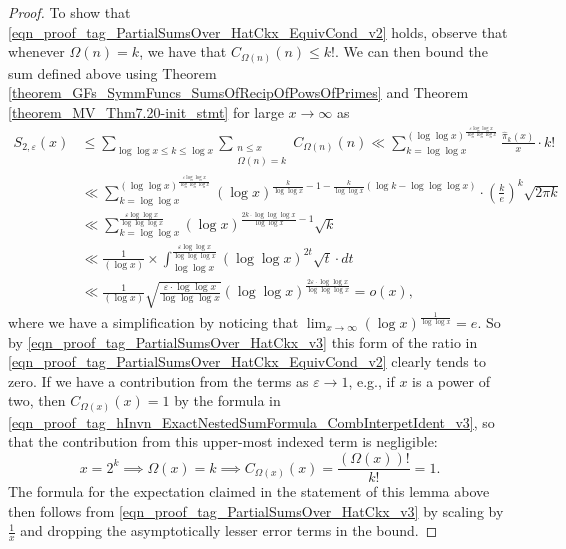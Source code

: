 \documentclass[11pt,reqno,a4letter]{article}
\numberwithin{figure}{section}
\numberwithin{table}{section}
\theoremstyle{plain}
\numberwithin{theorem}{section}
\theoremstyle{definition}
\begin{document}
\begin{proof}
To show that \eqref{eqn_proof_tag_PartialSumsOver_HatCkx_EquivCond_v2} holds, 
observe that whenever $\Omega(n) = k$, we have that $C_{\Omega(n)}(n) \leq k!$. 
We can then bound the sum defined above using 
Theorem \ref{theorem_GFs_SymmFuncs_SumsOfRecipOfPowsOfPrimes} and 
Theorem \ref{theorem_MV_Thm7.20-init_stmt} for large $x \rightarrow \infty$ as 
\begin{align*} 
S_{2,\varepsilon}(x) & \leq 
     \sum_{\log\log x \leq k \leq \log x} \sum_{\substack{n \leq x \\ \Omega(n)=k}} C_{\Omega(n)}(n) 
     \ll \sum_{k=\log\log x}^{(\log\log x)^{\frac{\varepsilon \log\log x}{\log\log\log x}}} 
      \frac{\widehat{\pi}_k(x)}{x} \cdot k! \\ 
     & \ll \sum_{k=\log\log x}^{(\log\log x)^{\frac{\varepsilon \log\log x}{\log\log\log x}}} 
     (\log x)^{\frac{k}{\log\log x} - 1 - \frac{k}{\log\log x} \left( 
     \log k - \log\log\log x\right)} \cdot \left(\frac{k}{e}\right)^{k} \sqrt{2\pi k} \\ 
     & \ll \sum_{k=\log\log x}^{\frac{\varepsilon \log\log x}{\log\log\log x}} 
     (\log x)^{\frac{2k \cdot \log\log\log x}{\log\log x} - 1} \sqrt{k} \\ 
     & \ll \frac{1}{(\log x)} \times \int_{\log\log x}^{ 
     \frac{\varepsilon \log\log x}{\log\log\log x}} (\log\log x)^{2t} \sqrt{t} \cdot dt \\ 
     & \ll \frac{1}{(\log x)} \sqrt{\frac{\varepsilon \cdot \log\log x}{\log\log\log x}} 
     (\log\log x)^{\frac{2\varepsilon \cdot \log\log x}{\log\log\log x}} = o(x), 
\end{align*} 
where we have a simplification by noticing that 
$\lim_{x \rightarrow \infty} (\log x)^{\frac{1}{\log\log x}} = e$. 
So by \eqref{eqn_proof_tag_PartialSumsOver_HatCkx_v3} this 
form of the ratio in \eqref{eqn_proof_tag_PartialSumsOver_HatCkx_EquivCond_v2} clearly tends to zero. 
If we have a contribution from the terms as $\varepsilon \rightarrow 1$, 
e.g., if $x$ is a power of two, then $C_{\Omega(x)}(x) = 1$ by the formula in 
\eqref{eqn_proof_tag_hInvn_ExactNestedSumFormula_CombInterpetIdent_v3}, so that 
the contribution from this upper-most indexed term is negligible: 
\[
x=2^k \implies \Omega(x) = k \implies C_{\Omega(x)}(x) = \frac{(\Omega(x))!}{k!} = 1. 
\]
The formula for the expectation claimed in the statement of this lemma above then 
follows from \eqref{eqn_proof_tag_PartialSumsOver_HatCkx_v3} by scaling by 
$\frac{1}{x}$ and dropping the asymptotically lesser error terms in the bound. 
\end{proof} 
\end{document}
